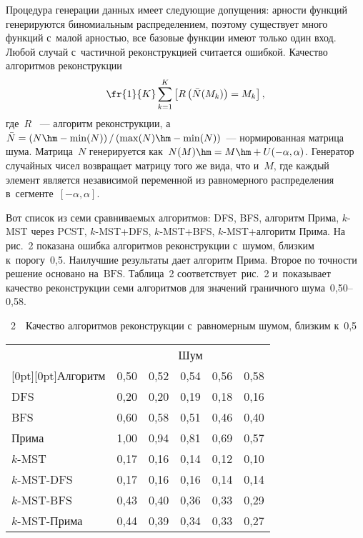 \begin{multicols}{2}
Процедура генерации данных имеет следующие допущения: арности функций 
генерируются биномиальным распределением, поэтому существует много функций 
с~малой арностью, все базовые функции имеют только один вход. Любой случай 
с~частичной реконструкцией считается ошибкой. Качество алгоритмов реконструкции
$$
\fr{1}{K}\sum\limits_{k=1}^K \left[ R\left( \bar{N}(M_k)\right)=M_k\right],
$$
где~$R$ ~--- алгоритм реконструкции, а~$\bar{N}=\left(N \hm-
\min(N)\right)/\left(\max(N)\hm-\min(N)\right)$~--- нормированная мат\-ри\-ца шума. 
Мат\-ри\-ца~$N$ генерируется как~$N(M)\hm=M\hm+U(-\alpha,\alpha)$.
Генератор случайных чисел возвращает матрицу того же вида, что и~$M$, где каждый 
элемент является независимой переменной из равномерного распределения 
в~сегменте~$[-\alpha,\alpha]$.

Вот список из семи сравниваемых алгоритмов:
DFS,
BFS,
алгоритм Прима,
$k$-MST через PCST,
$k$-MST\;+\;DFS,
$k$-MST\;+\;BFS,
$k$-MST\;+\;ал\-го\-ритм Прима.
На рис.~2 показана ошибка алгоритмов реконструкции 
с~шумом, близ\-ким к~порогу~0,5. Наилучшие результаты дает алгоритм Прима. Второе по 
точности решение основано на~$\text{BFS}$. Таб\-ли\-ца~2 
соответствует~рис.~2 и~показывает качество реконструкции 
семи алгоритмов для значений граничного шума~0,50--0,58.





\begin{center}
\parbox{75mm}{{{\tablename~2}\ \ \small{Качество алгоритмов реконструкции с~равномерным шумом, близким 
к~0,5
}}
}
    
    
\vspace*{6pt}

  {\small  \begin{tabular}{|l|ccccc|}
      \hline
                  & \multicolumn{5}{c|}{Шум}\\%
       \cline{2-6}
        \multicolumn{1}{|c|}{\raisebox{6pt}[0pt][0pt]{Алгоритм}}                          
&0,50&0,52&0,54&0,56&0,58\\
                    \hline
      DFS        &0,20 &0,20 &0,19 &0,18 &0,16\\
      BFS        &0,60 &0,58 &0,51 &0,46 &0,40\\
      Прима    &1,00 &0,94&0,81&0,69&0,57\\
      $k$-MST     &0,17 &0,16 &0,14 &0,12 &0,10\\
      $k$-MST-DFS   &0,17 &0,16 &0,16 &0,14 &0,14 \\
      $k$-MST-BFS   &0,43 &0,40 &0,36 &0,33 &0,29 \\
      $k$-MST-Прима  &0,44 &0,39 &0,34 &0,33 &0,27 \\
      \hline
    \end{tabular}
    }
\end{center}


\end{multicols}
